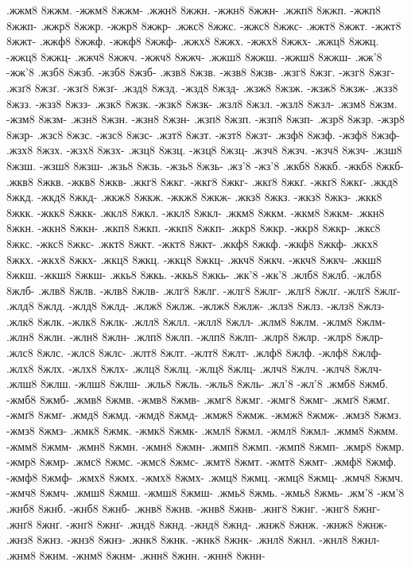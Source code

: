 {.жжм8 8жжм. -жжм8 8жжм-
.жжн8 8жжн. -жжн8 8жжн-
.жжп8 8жжп. -жжп8 8жжп-
.жжр8 8жжр. -жжр8 8жжр-
.жжс8 8жжс. -жжс8 8жжс-
.жжт8 8жжт. -жжт8 8жжт-
.жжф8 8жжф. -жжф8 8жжф-
.жжх8 8жжх. -жжх8 8жжх-
.жжц8 8жжц. -жжц8 8жжц-
.жжч8 8жжч. -жжч8 8жжч-
.жжш8 8жжш. -жжш8 8жжш-
.жж'8 -жж'8
.жзб8 8жзб. -жзб8 8жзб-
.жзв8 8жзв. -жзв8 8жзв-
.жзг8 8жзг. -жзг8 8жзг-
.жзґ8 8жзґ. -жзґ8 8жзґ-
.жзд8 8жзд. -жзд8 8жзд-
.жзж8 8жзж. -жзж8 8жзж-
.жзз8 8жзз. -жзз8 8жзз-
.жзк8 8жзк. -жзк8 8жзк-
.жзл8 8жзл. -жзл8 8жзл-
.жзм8 8жзм. -жзм8 8жзм-
.жзн8 8жзн. -жзн8 8жзн-
.жзп8 8жзп. -жзп8 8жзп-
.жзр8 8жзр. -жзр8 8жзр-
.жзс8 8жзс. -жзс8 8жзс-
.жзт8 8жзт. -жзт8 8жзт-
.жзф8 8жзф. -жзф8 8жзф-
.жзх8 8жзх. -жзх8 8жзх-
.жзц8 8жзц. -жзц8 8жзц-
.жзч8 8жзч. -жзч8 8жзч-
.жзш8 8жзш. -жзш8 8жзш-
.жзь8 8жзь. -жзь8 8жзь-
.жз'8 -жз'8
.жкб8 8жкб. -жкб8 8жкб-
.жкв8 8жкв. -жкв8 8жкв-
.жкг8 8жкг. -жкг8 8жкг-
.жкґ8 8жкґ. -жкґ8 8жкґ-
.жкд8 8жкд. -жкд8 8жкд-
.жкж8 8жкж. -жкж8 8жкж-
.жкз8 8жкз. -жкз8 8жкз-
.жкк8 8жкк. -жкк8 8жкк-
.жкл8 8жкл. -жкл8 8жкл-
.жкм8 8жкм. -жкм8 8жкм-
.жкн8 8жкн. -жкн8 8жкн-
.жкп8 8жкп. -жкп8 8жкп-
.жкр8 8жкр. -жкр8 8жкр-
.жкс8 8жкс. -жкс8 8жкс-
.жкт8 8жкт. -жкт8 8жкт-
.жкф8 8жкф. -жкф8 8жкф-
.жкх8 8жкх. -жкх8 8жкх-
.жкц8 8жкц. -жкц8 8жкц-
.жкч8 8жкч. -жкч8 8жкч-
.жкш8 8жкш. -жкш8 8жкш-
.жкь8 8жкь. -жкь8 8жкь-
.жк'8 -жк'8
.жлб8 8жлб. -жлб8 8жлб-
.жлв8 8жлв. -жлв8 8жлв-
.жлг8 8жлг. -жлг8 8жлг-
.жлґ8 8жлґ. -жлґ8 8жлґ-
.жлд8 8жлд. -жлд8 8жлд-
.жлж8 8жлж. -жлж8 8жлж-
.жлз8 8жлз. -жлз8 8жлз-
.жлк8 8жлк. -жлк8 8жлк-
.жлл8 8жлл. -жлл8 8жлл-
.жлм8 8жлм. -жлм8 8жлм-
.жлн8 8жлн. -жлн8 8жлн-
.жлп8 8жлп. -жлп8 8жлп-
.жлр8 8жлр. -жлр8 8жлр-
.жлс8 8жлс. -жлс8 8жлс-
.жлт8 8жлт. -жлт8 8жлт-
.жлф8 8жлф. -жлф8 8жлф-
.жлх8 8жлх. -жлх8 8жлх-
.жлц8 8жлц. -жлц8 8жлц-
.жлч8 8жлч. -жлч8 8жлч-
.жлш8 8жлш. -жлш8 8жлш-
.жль8 8жль. -жль8 8жль-
.жл'8 -жл'8
.жмб8 8жмб. -жмб8 8жмб-
.жмв8 8жмв. -жмв8 8жмв-
.жмг8 8жмг. -жмг8 8жмг-
.жмґ8 8жмґ. -жмґ8 8жмґ-
.жмд8 8жмд. -жмд8 8жмд-
.жмж8 8жмж. -жмж8 8жмж-
.жмз8 8жмз. -жмз8 8жмз-
.жмк8 8жмк. -жмк8 8жмк-
.жмл8 8жмл. -жмл8 8жмл-
.жмм8 8жмм. -жмм8 8жмм-
.жмн8 8жмн. -жмн8 8жмн-
.жмп8 8жмп. -жмп8 8жмп-
.жмр8 8жмр. -жмр8 8жмр-
.жмс8 8жмс. -жмс8 8жмс-
.жмт8 8жмт. -жмт8 8жмт-
.жмф8 8жмф. -жмф8 8жмф-
.жмх8 8жмх. -жмх8 8жмх-
.жмц8 8жмц. -жмц8 8жмц-
.жмч8 8жмч. -жмч8 8жмч-
.жмш8 8жмш. -жмш8 8жмш-
.жмь8 8жмь. -жмь8 8жмь-
.жм'8 -жм'8
.жнб8 8жнб. -жнб8 8жнб-
.жнв8 8жнв. -жнв8 8жнв-
.жнг8 8жнг. -жнг8 8жнг-
.жнґ8 8жнґ. -жнґ8 8жнґ-
.жнд8 8жнд. -жнд8 8жнд-
.жнж8 8жнж. -жнж8 8жнж-
.жнз8 8жнз. -жнз8 8жнз-
.жнк8 8жнк. -жнк8 8жнк-
.жнл8 8жнл. -жнл8 8жнл-
.жнм8 8жнм. -жнм8 8жнм-
.жнн8 8жнн. -жнн8 8жнн-
}
